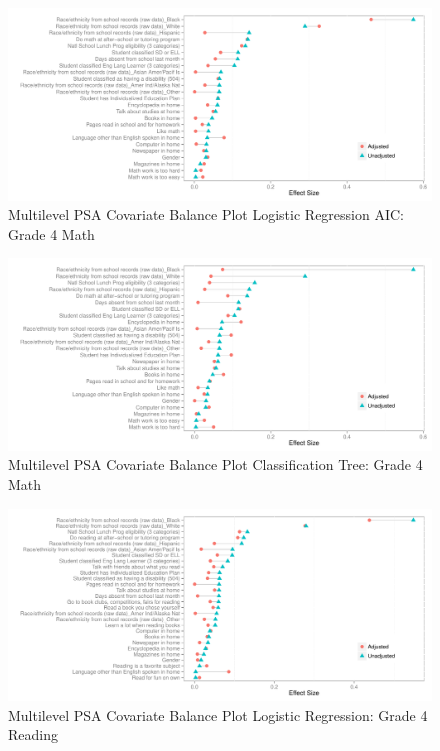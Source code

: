 \begin{figure}[h!]
\begin{center}
\includegraphics[width=\textwidth]{../Figures2009/g4math-mlpsa-lrAIC-balance.pdf}
\caption{Multilevel PSA Covariate Balance Plot Logistic Regression AIC: Grade 4 Math}
\end{center}
\end{figure}

\begin{figure}[h!]
\begin{center}
\includegraphics[width=\textwidth]{../Figures2009/g4math-mlpsa-ctree-balance.pdf}
\caption{Multilevel PSA Covariate Balance Plot Classification Tree: Grade 4 Math}
\end{center}
\end{figure}

\begin{figure}[h!]
\begin{center}
\includegraphics[width=\textwidth]{../Figures2009/g4read-mlpsa-lr-balance.pdf}
\caption{Multilevel PSA Covariate Balance Plot Logistic Regression: Grade 4 Reading}
\end{center}
\end{figure}

